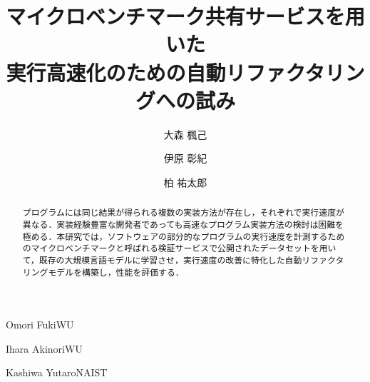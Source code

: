 \documentclass[submit,techrep,noauthor]{ipsj}
\begin{document}
\title{マイクロベンチマーク共有サービスを用いた\\
実行高速化のための自動リファクタリングへの試み}





\author{大森 楓己}{Omori Fuki}{WU}%
\author{伊原 彰紀}{Ihara Akinori}{WU}
\author{柏 祐太郎}{Kashiwa Yutaro}{NAIST}

\begin{abstract}
プログラムには同じ結果が得られる複数の実装方法が存在し，それぞれで実行速度が異なる．実装経験豊富な開発者であっても高速なプログラム実装方法の検討は困難を極める．本研究では，ソフトウェアの部分的なプログラムの実行速度を計測するためのマイクロベンチマークと呼ばれる検証サービスで公開されたデータセットを用いて，既存の大規模言語モデルに学習させ，実行速度の改善に特化した自動リファクタリングモデルを構築し，性能を評価する．
\end{abstract}


%
%
%

\maketitle
\end{document}
